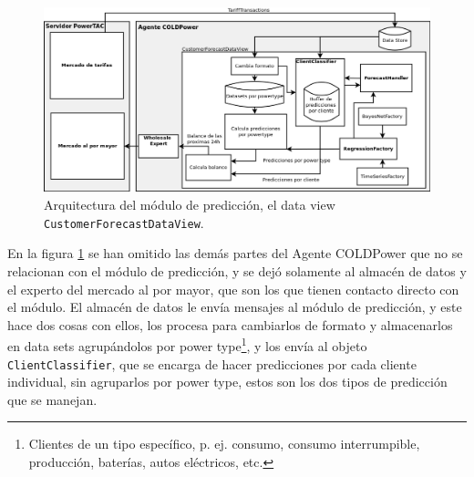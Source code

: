 \begin{figure}[h]
	\centering
	\includegraphics[width=16cm]{img/ArquitecturaModuloPrediccion.png}
	\caption{Arquitectura del módulo de predicción, el data view \texttt{CustomerForecastDataView}.}
	\label{fig:ArquitecturaModuloPrediccion}
\end{figure}

En la figura \ref{fig:ArquitecturaModuloPrediccion} se han omitido las demás partes del Agente COLDPower que no se relacionan con el módulo de predicción, y se dejó solamente al almacén de datos y el experto del mercado al por mayor, que son los que tienen contacto directo con el módulo. El almacén de datos le envía mensajes al módulo de predicción, y este hace dos cosas con ellos, los procesa para cambiarlos de formato y almacenarlos en data sets agrupándolos por power type\footnote{Clientes de un tipo específico, p. ej. consumo, consumo interrumpible, producción, baterías, autos eléctricos, etc.}, y los envía al objeto \texttt{ClientClassifier}, que se encarga de hacer predicciones por cada cliente individual, sin agruparlos por power type, estos son los dos tipos de predicción que se manejan. 

